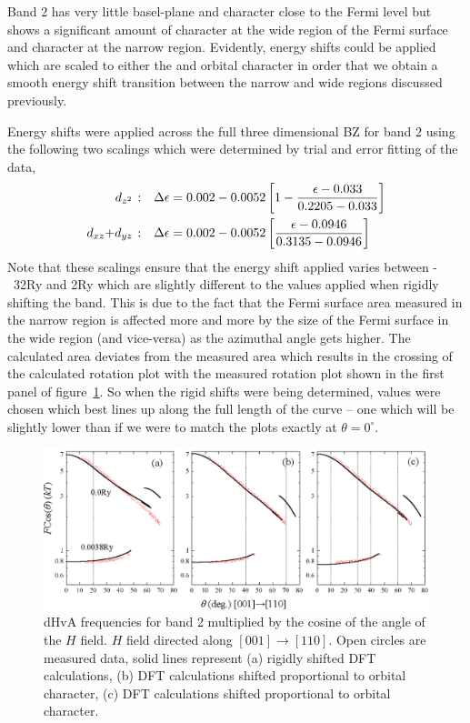 Band $2$ has very little basel-plane \Dxy and \DxTwoyTwo character close to the Fermi level but shows a significant amount of \DzTwo character at the wide region of the Fermi surface and \DxzDyz character at the narrow region. Evidently, energy shifts could be applied which are scaled to either the \DzTwo and \DxzDyz orbital character in order that we obtain a smooth energy shift transition between the narrow and wide regions discussed previously. 

Energy shifts were applied across the full three dimensional \ac{BZ} for band $2$ using the following two scalings which were determined by trial and error fitting of the data,
\begin{align*}
\textrm{\DzTwo:}\quad \Delta\epsilon &= 0.002 - 0.0052 \left[1 - \frac{\epsilon - 0.033}{0.2205 - 0.033}\right] \\
\textrm{\DxzDyz:}\quad \Delta\epsilon &= 0.002 - 0.0052 \left[\frac{\epsilon - 0.0946}{0.3135 - 0.0946}\right]
\end{align*}
Note that these scalings ensure that the energy shift applied varies between \unit{-32}{\milli\textrm{Ry}} and \unit{2}{\milli\textrm{Ry}} which are slightly different to the values applied when rigidly shifting the band. This is due to the fact that the Fermi surface area measured in the narrow region is affected more and more by the size of the Fermi surface in the wide region (and vice-versa) as the azimuthal angle gets higher. The calculated area deviates from the measured area which results in the crossing of the calculated rotation plot with the measured rotation plot shown in the first panel of figure~\ref{Fig:ResD:Band2DCharacterRigidComparison}. So when the rigid shifts were being determined, values were chosen which best lines up along the full length of the curve -- one which will be slightly lower than if we were to match the plots exactly at $\theta=0^\circ$.

\begin{figure}[htbp]
    \begin{center}
        \includegraphics[scale=0.8]{Chapter-dHvABaFe2P2/Figures/AngleDepMeasurements/BandCharacterRotPlot/Band2_110_RotPlot_Comparison}
        \caption{dHvA frequencies for band 2 multiplied by the cosine of the angle of the $H$ field. $H$ field directed along $[001]\rightarrow[110]$. Open circles are measured data, solid lines represent (a) rigidly shifted \ac{DFT} calculations, (b) \ac{DFT} calculations shifted proportional to \DzTwo orbital character, (c) \ac{DFT} calculations shifted proportional to \DxzDyz orbital character.}
        \label{Fig:ResD:Band2DCharacterRigidComparison}
    \end{center}
\end{figure}


